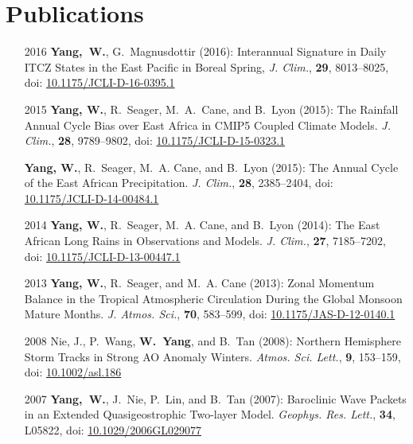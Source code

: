 \documentclass[11pt]{article}
\newcommand{\doi}[1]{ doi: \href{https://doi.org/#1}{#1} }
\begin{document}
\section{Publications}
\begin{itemize}[leftmargin=10ex]
	\item[2016] \textbf{Yang,~W.}, G.~Magnusdottir (2016): Interannual Signature in Daily ITCZ States in the East Pacific in Boreal Spring, \newblock \emph{J. Clim.},  \textbf{29}, 8013--8025, \doi{10.1175/JCLI-D-16-0395.1}
	
	\item[2015] \textbf{Yang, W.}, R.~Seager, M.~A.~Cane, and B.~Lyon (2015): The Rainfall Annual Cycle Bias over East Africa in CMIP5 Coupled Climate Models.
\newblock \emph{J. Clim.}, \textbf{28}, 9789--9802, \doi{10.1175/JCLI-D-15-0323.1}

	\item[] \textbf{Yang, W.}, R.~Seager, M.~A. Cane, and B.~Lyon (2015): The Annual Cycle of the
  East African Precipitation.
\newblock \emph{J. Clim.}, \textbf{28}, 2385--2404, \doi {10.1175/JCLI-D-14-00484.1}

	\item[2014] \textbf{Yang, W.}, R.~Seager, M.~A. Cane, and B.~Lyon (2014): The East African Long
  Rains in Observations and Models.
\newblock \emph{J. Clim.}, \textbf{27}, 7185--7202, \doi{10.1175/JCLI-D-13-00447.1}

	\item[2013] \textbf{Yang, W.}, R.~Seager, and M.~A. Cane (2013): Zonal Momentum Balance in the
  Tropical Atmospheric Circulation During the Global Monsoon Mature Months.
\newblock \emph{J. Atmos. Sci.}, \textbf{70}, 583--599, \doi{10.1175/JAS-D-12-0140.1}

	\item[2008] Nie, J., P.~Wang, \textbf{W.~Yang}, and B.~Tan (2008): Northern Hemisphere Storm Tracks
  in Strong AO Anomaly Winters.
\newblock \emph{Atmos. Sci. Lett.}, \textbf{9}, 153--159, \doi{10.1002/asl.186}

	\item[2007] \textbf{Yang,~W.}, J.~Nie, P.~Lin, and B.~Tan (2007): Baroclinic Wave Packets in an
  Extended Quasigeostrophic Two-layer Model.  \emph{Geophys. Res. Lett.}, \textbf{34}, L05822,  \doi{10.1029/2006GL029077}
\end{itemize}
\end{document}
